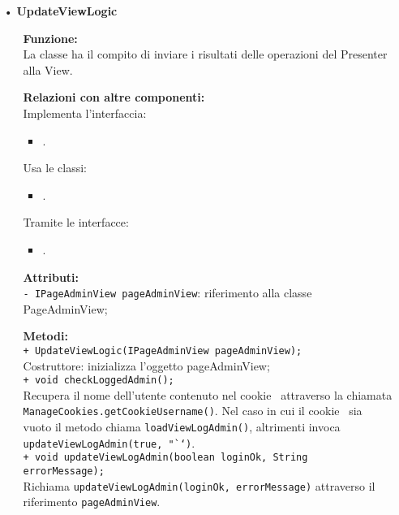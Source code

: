 {\begin{sloppypar}
{\begin{itemize}
		\item[•] \textbf{UpdateViewLogic}
			\begin{itemize}
				\item[]  \textbf{Funzione:} \\
				La classe ha il compito di inviare i risultati delle operazioni del Presenter alla View.
				
				\item[]  \textbf{Relazioni con altre componenti:} \\
				Implementa l'interfaccia:
				\begin{itemize}
					\item {}.
				\end{itemize}
				Usa le classi:
				\begin{itemize}
					\item {}.
				\end{itemize}
				Tramite le interfacce:
				\begin{itemize}
					\item {}.
				\end{itemize}
					
				\item[] \textbf{Attributi:}\\
					\texttt{- IPageAdminView pageAdminView}: riferimento alla classe PageAdminView;\\

				\item[] \textbf{Metodi:}\\
					\texttt{+ UpdateViewLogic(IPageAdminView pageAdminView);}\\
					Costruttore: inizializza l'oggetto pageAdminView;\\
					
					\texttt{+ void checkLoggedAdmin();}\\
					Recupera il nome dell’utente contenuto nel cookie\g~ attraverso la chiamata \texttt{ManageCookies.getCookieUsername()}. Nel caso in cui il cookie\g~ sia vuoto il metodo chiama \texttt{loadViewLogAdmin()}, altrimenti invoca \texttt{updateViewLogAdmin(true, "``)}.\\
					
					\texttt{+ void updateViewLogAdmin(boolean loginOk, String errorMessage);}\\
					Richiama \texttt{updateViewLogAdmin(loginOk, errorMessage)} attraverso il riferimento \texttt{pageAdminView}.\\
					

\end{itemize}
\end{itemize}}
\end{sloppypar}}
